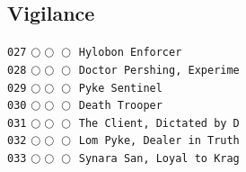 \documentclass[a4paper,landscape]{article}
\begin{document}
\begin{multicols*}{5}
\section{Vigilance} 
\vspace{-2mm} 
\texttt{027} \(\bigcirc\!\bigcirc\!\bigcirc\)  \texttt{Hylobon Enforcer} \vspace{-0.3mm}\\ 
\texttt{028} \(\bigcirc\!\bigcirc\!\bigcirc\)  \texttt{Doctor Pershing, Experime} \vspace{-0.3mm}\\ 
\texttt{029} \(\bigcirc\!\bigcirc\!\bigcirc\)  \texttt{Pyke Sentinel} \vspace{-0.3mm}\\ 
\texttt{030} \(\bigcirc\!\bigcirc\!\bigcirc\)  \texttt{Death Trooper} \vspace{-0.3mm}\\ 
\texttt{031} \(\bigcirc\!\bigcirc\!\bigcirc\)  \texttt{The Client, Dictated by D} \vspace{-0.3mm}\\ 
\texttt{032} \(\bigcirc\!\bigcirc\!\bigcirc\)  \texttt{Lom Pyke, Dealer in Truth} \vspace{-0.3mm}\\ 
\texttt{033} \(\bigcirc\!\bigcirc\!\bigcirc\)  \texttt{Synara San, Loyal to Krag} \vspace{-0.3mm}\\ 

\end{multicols*}
\end{document}
